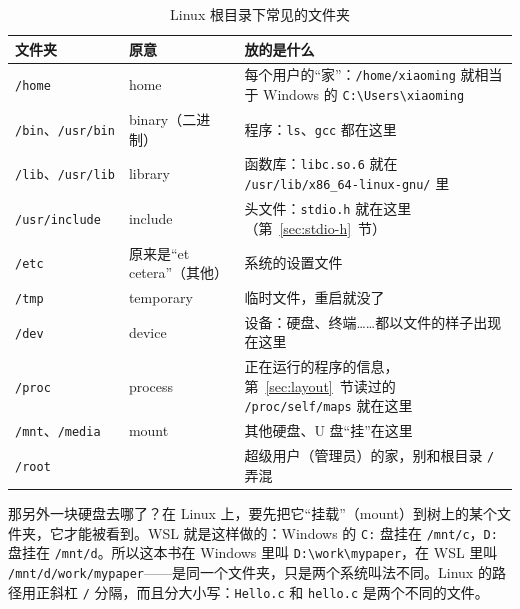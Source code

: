 \begin{table}[htbp]
  \begin{lazywide}
  \caption{Linux 根目录下常见的文件夹}
  \label{tab:fhs}
  \begin{tabular}{lL{3.8cm}L{6.0cm}}
    \toprule
    文件夹 & 原意 & 放的是什么 \\
    \midrule
    \texttt{/home} & home & 每个用户的“家”：\texttt{/home/xiaoming} 就相当于 Windows 的 \texttt{C:\textbackslash Users\textbackslash xiaoming} \\
    \texttt{/bin}、\texttt{/usr/bin} & binary（二进制） & 程序：\texttt{ls}、\texttt{gcc} 都在这里 \\
    \texttt{/lib}、\texttt{/usr/lib} & library & 函数库：\texttt{libc.so.6} 就在 \texttt{/usr/lib/x86\_64-linux-gnu/} 里 \\
    \texttt{/usr/include} & include & 头文件：\texttt{stdio.h} 就在这里（第~\ref{sec:stdio-h}~节） \\
    \texttt{/etc} & 原来是“et cetera”（其他） & 系统的设置文件 \\
    \texttt{/tmp} & temporary & 临时文件，重启就没了 \\
    \texttt{/dev} & device & 设备：硬盘、终端……都以文件的样子出现在这里 \\
    \texttt{/proc} & process & 正在运行的程序的信息，第~\ref{sec:layout}~节读过的 \texttt{/proc/self/maps} 就在这里 \\
    \texttt{/mnt}、\texttt{/media} & mount & 其他硬盘、U 盘“挂”在这里 \\
    \texttt{/root} & & 超级用户（管理员）的家，别和根目录 \texttt{/} 弄混 \\
    \bottomrule
  \end{tabular}
  \end{lazywide}
\end{table}

那另外一块硬盘去哪了？在 Linux 上，要先把它“挂载”（mount）到树上的某个文件夹，它才能被看到。WSL 就是这样做的：Windows 的 \texttt{C:} 盘挂在 \texttt{/mnt/c}，\texttt{D:} 盘挂在 \texttt{/mnt/d}。所以这本书在 Windows 里叫 \texttt{D:\textbackslash work\textbackslash mypaper}，在 WSL 里叫 \texttt{/mnt/d/work/mypaper}——是同一个文件夹，只是两个系统叫法不同。Linux 的路径用正斜杠 \texttt{/} 分隔，而且分大小写：\texttt{Hello.c} 和 \texttt{hello.c} 是两个不同的文件。

